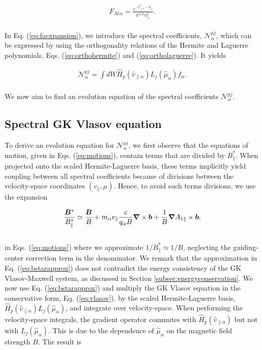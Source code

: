 \documentclass[preprint,12pt]{elsarticle}
\begin{document}
\begin{align} \label{eq:fma}
 F_{\mathcal{M} \alpha}=   \frac{e^{- \hat v_{\parallel  \alpha }^2 - \hat \mu_\alpha}}{\pi^{3/2} v_{\tau_\alpha}^{3}}.
\end{align}
\\
In Eq. (\ref{eq:faexpansion}), we introduce the spectral coefficients, $\mathcal{N}_\alpha^{pj}$, which can be expressed by using the orthogonality relations of the Hermite and Laguerre polynomials, Eqs. (\ref{eq:orthohermite}) and (\ref{eq:ortholaguerre}). It yields

\begin{align} \label{eq:npj}
  \mathcal{N}_\alpha^{pj}  = \int d W  \hat H_p(\hat v_{\parallel \alpha}) L_j(\hat \mu_\alpha) f_\alpha.
\end{align}
\\
We now aim to find an evolution equation of the spectral coefficients $\mathcal{N}_\alpha^{pj}$.

\subsection{Spectral GK Vlasov equation}
\label{subsec:spectralvlasov}

 To derive an evolution equation for $\mathcal{N}_\alpha^{pj}$, we first observe that the equations of motion, given in Eqs. (\ref{eq:motions}), contain terms that are divided by $B_\parallel^*$. When projected onto the scaled Hermite-Laguerre basis, these terms implicitly yield coupling between all spectral coefficients because of divisions between the velocity-space coordinates $(v_\parallel, \mu)$. Hence, to avoid such terms divisions, we use the expansion 

\begin{align} \label{eq:bstarapprox}
  \frac{\bm B^*}{B_\parallel^*} \simeq \frac{\bm B}{B} + m_\alpha v_{\parallel} \frac{c}{q_\alpha B} \grad \times \bm b + \frac{1}{B}\grad A_{1 \parallel} \times \bm b,
\end{align}
\\
in Eqs. (\ref{eq:motions}) where we approximate $1/B_{\parallel}^* \simeq 1/B$, neglecting the guiding-center correction term in the denominator. We remark that the approximation in Eq. (\ref{eq:bstarapprox}) does not contradict the energy consistency of the GK Vlasov-Maxwell system, as discussed in Section \ref{subsec:energyconservation}. We now use Eq. (\ref{eq:bstarapprox}) and multiply the GK Vlasov equation in the conservative form, Eq. (\ref{eq:vlasov}), by the scaled Hermite-Laguerre basis, $\hat H_p( \hat v_{\parallel \alpha} )  L_j(\hat \mu_\alpha )$, and integrate over velocity-space. When performing the velocity-space integrals, the gradient operator commutes with $\hat H_p( \hat v_{\parallel \alpha} )$ but not with $L_j(\hat \mu_\alpha )$. This is due to the dependence of $\hat \mu_\alpha$ on the magnetic field strength $B$. The result is
\end{document}
